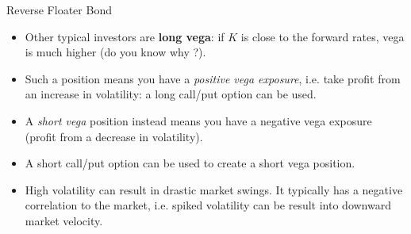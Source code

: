 \documentclass{beamer}
\begin{document}
\begin{frame}{Reverse Floater Bond}
	\begin{itemize}
		\item Other typical investors are \textbf{long vega}: if $K$ is close to the forward rates, vega is much higher (do you know why ?).
		\item Such a position means you have a \emph{positive vega exposure}, i.e. take profit from an increase in volatility: 
		a long call/put option can be used. 
		\item A \emph{short vega} position instead means you have a negative vega exposure (profit from a decrease in volatility). \item A short call/put option can be used to create a short vega position. 
		\item High volatility can result in drastic market swings. It typically has a negative correlation to the market, i.e. spiked volatility can be result into downward market velocity.
	\end{itemize}
\end{frame}
%
%
%
\end{document}
